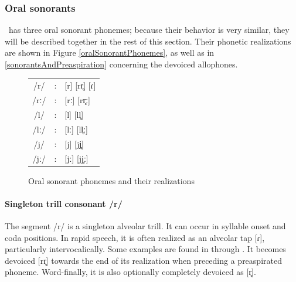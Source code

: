 \subsubsection{Oral sonorants}\label{oralSonorants}%
\PS\ has three oral sonorant phonemes; %
because their behavior is very similar, they will be described together in the rest of this section. 
Their phonetic realizations are shown in Figure \vref{oralSonorantPhonemes}, as well as in \SEC\ref{sonorantsAndPreaspiration} concerning the devoiced allophones. 
\begin{figure}\centering
\begin{tabular}{c c l}
/r/ &:& [r] [rr̥] [ɾ]\\ %
/rː/ &:& [rː] [rr̥ː] \\ %
/l/ &:& [l] [ll̥]\\ %
/lː/ &:& [lː] [ll̥ː]\\ %
/j/ &:& [j] [jj̥] \\ %
/jː/ &:& [jː] [jj̥ː] \\ %
\end{tabular}
\caption{Oral sonorant phonemes and their realizations}\label{oralSonorantPhonemes}%
\end{figure}


\paragraph{Singleton trill consonant /r/}
The segment /r/ is a singleton alveolar trill. It can occur in syllable onset and coda positions. %
In rapid speech, it is often realized as an alveolar tap [ɾ], particularly intervocalically. Some examples are found in  through . It becomes devoiced [rr̥] towards the end of its realization when preceding a preaspirated phoneme. 
Word-finally, it is also optionally completely devoiced as [r̥].%

